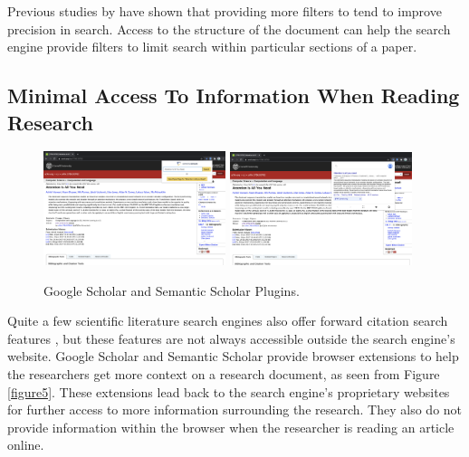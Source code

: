 Previous studies by \parencite{kacem2018analysis} have shown that providing more filters to tend to improve precision in search. Access to the structure of the document can help the search engine provide filters to limit search within particular sections of a paper.

\pagebreak
\subsection{Minimal Access To Information When Reading Research}

\begin{figure}[h]
    \includegraphics[width=0.475\textwidth]{src/images/gg-plugin.png}
    \hfill
    \includegraphics[width=0.475\textwidth]{src/images/ss-plugin.png}
    \caption{ Google Scholar and Semantic Scholar Plugins. }
    \label{figure\arabic{figurecounter}}
\end{figure}
Quite a few scientific literature search engines also offer forward citation search features \parencite{gusenbauer2020academic}, but these features are not always accessible outside the search engine’s website. 
Google Scholar and Semantic Scholar provide browser extensions to help the researchers get more context on a research document, as seen from Figure \ref{figure5}. 
These extensions lead back to the search engine's proprietary websites for further access to more information surrounding the research. They also do not provide information within the browser when the researcher is reading an article online. 
